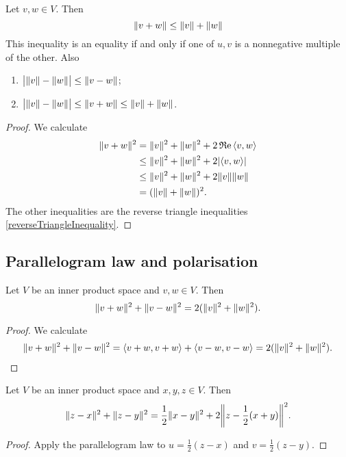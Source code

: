\begin{theorem}
Let $v,w\in V$. Then
\[ \lVert v+w\rVert \leq \lVert v\rVert+\lVert w\rVert \]
This inequality is an equality if and only if one of $u,v$ is a nonnegative multiple of the other. Also
\begin{enumerate}
\item $\big|\lVert v\rVert-\lVert w\rVert\big|\leq \lVert v-w\rVert$;
\item $\big|\lVert v\rVert-\lVert w\rVert\big| \leq \lVert v+w\rVert \leq \lVert v\rVert+\lVert w\rVert$.
\end{enumerate}
\end{theorem}
\begin{proof}
We calculate
\begin{align*}
\norm{v+w}^2 &= \norm{v}^2+\norm{w}^2+2\Re\inner{v,w} \\
&\leq \norm{v}^2+\norm{w}^2+2|\inner{v,w}| \\
&\leq \norm{v}^2+\norm{w}^2+2\norm{v}\norm{w} \\
&= (\norm{v}+\norm{w})^2.
\end{align*}
The other inequalities are the reverse triangle inequalities \ref{reverseTriangleInequality}.
\end{proof}

\subsection{Parallelogram law and polarisation}
\begin{theorem} \label{parallelogramLaw}
Let $V$ be an inner product space and $v,w\in V$. Then
\[ \lVert v+w\rVert^2 + \lVert v-w\rVert^2 = 2 (\lVert v\rVert^2+\lVert w\rVert^2). \]
\end{theorem}
\begin{proof}
We calculate
\begin{align*}
\norm{v+w}^2 + \norm{v-w}^2 = \inner{v+w, v+w}+\inner{v-w,v-w} = 2(\norm{v}^2 + \norm{w}^2).
\end{align*}
\end{proof}
\begin{corollary} \label{AppoloniusIdentity}
Let $V$ be an inner product space and $x,y,z\in V$. Then
\[ \norm{z-x}^2 + \norm{z-y}^2 = \frac{1}{2}\norm{x-y}^2 + 2\norm*{z-\frac{1}{2}(x+y)}^2. \]
\end{corollary}
\begin{proof}
Apply the parallelogram law to $u = \frac{1}{2}(z-x)$ and $v = \frac{1}{2}(z-y)$.
\end{proof}

